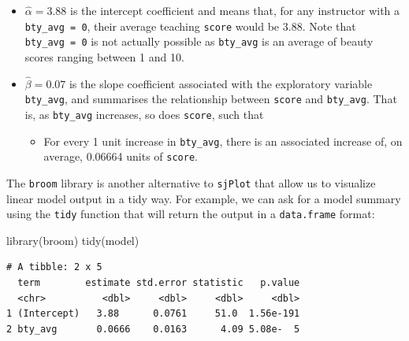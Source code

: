 \documentclass[
  letterpaper,
  DIV=11,
  numbers=noendperiod]{scrartcl}
\newenvironment{Shaded}{\begin{snugshade}}{\end{snugshade}}
\newcommand{\FunctionTok}[1]{\textcolor[rgb]{0.28,0.35,0.67}{#1}}
\newcommand{\NormalTok}[1]{\textcolor[rgb]{0.00,0.23,0.31}{#1}}
\providecommand{\tightlist}{%
  \setlength{\itemsep}{0pt}\setlength{\parskip}{0pt}}\usepackage{longtable,booktabs,array}
\begin{document}
\begin{itemize}
\tightlist
\item
  \(\widehat{\alpha} = 3.88\) is the intercept coefficient and means
  that, for any instructor with a \texttt{bty\_avg\ =\ 0}, their average
  teaching \texttt{score} would be 3.88. Note that
  \texttt{bty\_avg\ =\ 0} is not actually possible as \texttt{bty\_avg}
  is an average of beauty scores ranging between 1 and 10.
\item
  \(\widehat{\beta} = 0.07\) is the slope coefficient associated with
  the exploratory variable \texttt{bty\_avg}, and summarises the
  relationship between \texttt{score} and \texttt{bty\_avg}. That is, as
  \texttt{bty\_avg} increases, so does \texttt{score}, such that

  \begin{itemize}
  \tightlist
  \item
    For every 1 unit increase in \texttt{bty\_avg}, there is an
    associated increase of, on average, 0.06664 units of \texttt{score}.
  \end{itemize}
\end{itemize}

\begin{tcolorbox}[enhanced jigsaw, leftrule=.75mm, opacityback=0, colbacktitle=quarto-callout-note-color!10!white, left=2mm, rightrule=.15mm, colframe=quarto-callout-note-color-frame, colback=white, coltitle=black, breakable, bottomtitle=1mm, title=\textcolor{quarto-callout-note-color}{\faInfo}\hspace{0.5em}{Note}, toprule=.15mm, titlerule=0mm, toptitle=1mm, bottomrule=.15mm, opacitybacktitle=0.6, arc=.35mm]

The \texttt{broom} library is another alternative to \texttt{sjPlot}
that allow us to visualize linear model output in a tidy way. For
example, we can ask for a model summary using the \texttt{tidy} function
that will return the output in a \texttt{data.frame} format:

\begin{Shaded}
\begin{Highlighting}[]
\FunctionTok{library}\NormalTok{(broom)}
\FunctionTok{tidy}\NormalTok{(model)}
\end{Highlighting}
\end{Shaded}

\begin{verbatim}
# A tibble: 2 x 5
  term        estimate std.error statistic   p.value
  <chr>          <dbl>     <dbl>     <dbl>     <dbl>
1 (Intercept)   3.88      0.0761     51.0  1.56e-191
2 bty_avg       0.0666    0.0163      4.09 5.08e-  5
\end{verbatim}

\end{tcolorbox}
\end{document}
